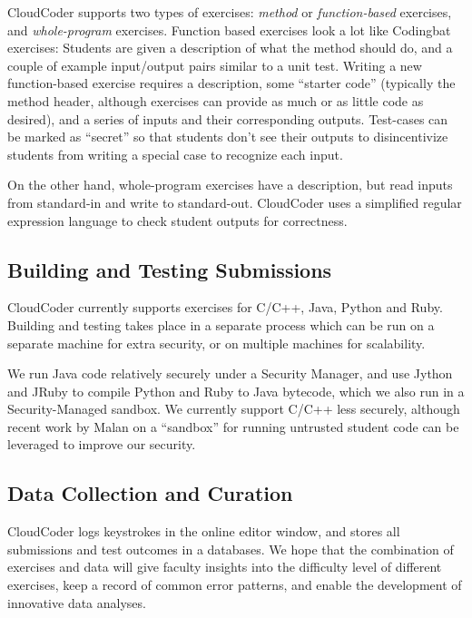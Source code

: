 \documentclass{sig-alternate}
\begin{document}
CloudCoder supports two types of exercises:  {\em method} or {\em function-based}
exercises, and {\em whole-program} exercises.  Function based exercises look
a lot like Codingbat exercises:  Students are given a description of
what the method should do, and a couple of example input/output pairs
similar to a unit test.  Writing a new function-based exercise
requires a description, some ``starter code'' (typically the method
header, although exercises can provide as much or as little code as
desired), and a series of inputs and their corresponding outputs.
Test-cases can be marked as ``secret'' so that students don't see their
outputs to disincentivize students from writing a special case to
recognize each input.

On the other hand, whole-program exercises
have a description, but read inputs from
standard-in and write to standard-out.  CloudCoder uses a
simplified regular expression language to check student outputs for
correctness.


\subsection{Building and Testing Submissions}

CloudCoder currently supports exercises for C/C++, Java, Python and
Ruby.  Building and testing takes place in a separate process which
can be run on a separate machine for extra security, or on multiple
machines for scalability.

We run Java code relatively securely under a Security Manager, and 
use Jython and JRuby to compile Python and Ruby to Java
bytecode, which we also run in a Security-Managed sandbox.  We
currently support C/C++ less securely, although 
recent work by Malan \cite{Malan:2013:CSS:2445196.2445242} on a
``sandbox'' for running untrusted student code can be leveraged to improve our security.


\subsection{Data Collection and Curation}

CloudCoder logs keystrokes in the online editor window, and 
stores all submissions and test outcomes in a databases.
We hope that the combination of exercises and data will give faculty
insights into the difficulty level of different exercises, keep a
record of common error patterns, and enable the development of
innovative data analyses.
\end{document}
